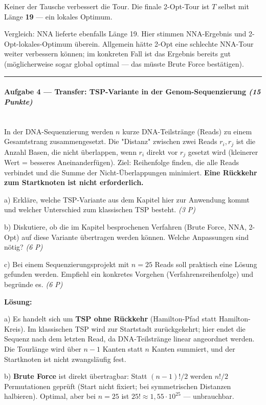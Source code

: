 \documentclass[11pt, a4paper]{article}
\begin{document}
Keiner der Tausche verbessert die Tour. Die finale 2-Opt-Tour ist $T$ selbst mit Länge \textbf{19} — ein lokales Optimum.


Vergleich: NNA lieferte ebenfalls Länge 19. Hier stimmen NNA-Ergebnis und 2-Opt-lokales-Optimum überein. Allgemein hätte 2-Opt eine schlechte NNA-Tour weiter verbessern können; im konkreten Fall ist das Ergebnis bereits gut (möglicherweise sogar global optimal — das müsste Brute Force bestätigen).



\noindent\textcolor{rulegray}{\rule{\linewidth}{0.4pt}}


\paragraph{Aufgabe 4 — Transfer: TSP-Variante in der Genom-Sequenzierung \textit{(15 Punkte)}}\mbox{}\\[2pt]

In der DNA-Sequenzierung werden $n$ kurze DNA-Teilstränge (Reads) zu einem Gesamtstrang zusammengesetzt. Die "Distanz" zwischen zwei Reads $r_i,r_j$ ist die Anzahl Basen, die nicht überlappen, wenn $r_i$ direkt vor $r_j$ gesetzt wird (kleinerer Wert = besseres Aneinanderfügen). Ziel: Reihenfolge finden, die alle Reads verbindet und die Summe der Nicht-Überlappungen minimiert. \textbf{Eine Rückkehr zum Startknoten ist nicht erforderlich.}


a) Erkläre, welche TSP-Variante aus dem Kapitel hier zur Anwendung kommt und welcher Unterschied zum klassischen TSP besteht. \textit{(3 P)}


b) Diskutiere, ob die im Kapitel besprochenen Verfahren (Brute Force, NNA, 2-Opt) auf diese Variante übertragen werden können. Welche Anpassungen sind nötig? \textit{(6 P)}


c) Bei einem Sequenzierungsprojekt mit $n=25$ Reads soll praktisch eine Lösung gefunden werden. Empfiehl ein konkretes Vorgehen (Verfahrensreihenfolge) und begründe es. \textit{(6 P)}


\textbf{Lösung:}


a) Es handelt sich um \textbf{TSP ohne Rückkehr} (Hamilton-Pfad statt Hamilton-Kreis). Im klassischen TSP wird zur Startstadt zurückgekehrt; hier endet die Sequenz nach dem letzten Read, da DNA-Teilstränge linear angeordnet werden. Die Tourlänge wird über $n-1$ Kanten statt $n$ Kanten summiert, und der Startknoten ist nicht zwangsläufig fest.


b) \textbf{Brute Force} ist direkt übertragbar: Statt $(n-1)!/2$ werden $n!/2$ Permutationen geprüft (Start nicht fixiert; bei symmetrischen Distanzen halbieren). Optimal, aber bei $n=25$ ist $25!\approx 1{,}55\cdot 10^{25}$ — unbrauchbar.
\end{document}
